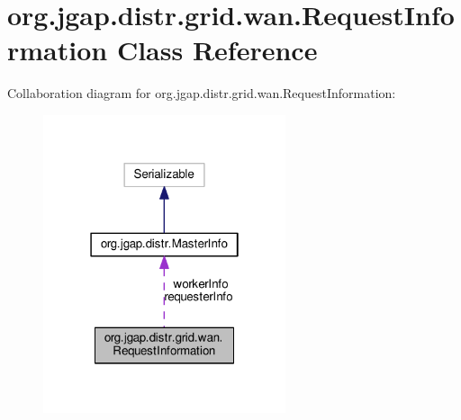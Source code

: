 \hypertarget{classorg_1_1jgap_1_1distr_1_1grid_1_1wan_1_1_request_information}{\section{org.\-jgap.\-distr.\-grid.\-wan.\-Request\-Information Class Reference}
\label{classorg_1_1jgap_1_1distr_1_1grid_1_1wan_1_1_request_information}
}


Collaboration diagram for org.\-jgap.\-distr.\-grid.\-wan.\-Request\-Information\-:
\nopagebreak
\begin{figure}[H]
\begin{center}
\leavevmode
\includegraphics[width=202pt]{classorg_1_1jgap_1_1distr_1_1grid_1_1wan_1_1_request_information__coll__graph}
\end{center}
\end{figure}
